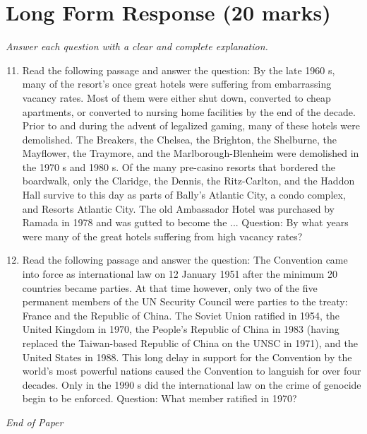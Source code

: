\documentclass[12pt]{article}
\begin{document}
\section*{Long Form Response (20 marks)}
\textit{Answer each question with a clear and complete explanation.}
\begin{enumerate}[label=\arabic*.]
\setcounter{enumi}{10}
\item Read the following passage and answer the question: By the late 1960 s, many of the resort's once great hotels were suffering from embarrassing vacancy rates. Most of them were either shut down, converted to cheap apartments, or converted to nursing home facilities by the end of the decade. Prior to and during the advent of legalized gaming, many of these hotels were demolished. The Breakers, the Chelsea, the Brighton, the Shelburne, the Mayflower, the Traymore, and the Marlborough-Blenheim were demolished in the 1970 s and 1980 s. Of the many pre-casino resorts that bordered the boardwalk, only the Claridge, the Dennis, the Ritz-Carlton, and the Haddon Hall survive to this day as parts of Bally's Atlantic City, a condo complex, and Resorts Atlantic City. The old Ambassador Hotel was purchased by Ramada in 1978 and was gutted to become the ... Question: By what years were many of the great hotels suffering from high vacancy rates?
\item Read the following passage and answer the question: The Convention came into force as international law on 12 January 1951 after the minimum 20 countries became parties. At that time however, only two of the five permanent members of the UN Security Council were parties to the treaty: France and the Republic of China. The Soviet Union ratified in 1954, the United Kingdom in 1970, the People's Republic of China in 1983 (having replaced the Taiwan-based Republic of China on the UNSC in 1971), and the United States in 1988. This long delay in support for the Convention by the world's most powerful nations caused the Convention to languish for over four decades. Only in the 1990 s did the international law on the crime of genocide begin to be enforced. Question: What member ratified in 1970?
\end{enumerate}

\vfill
\noindent\textit{End of Paper}
\end{document}
